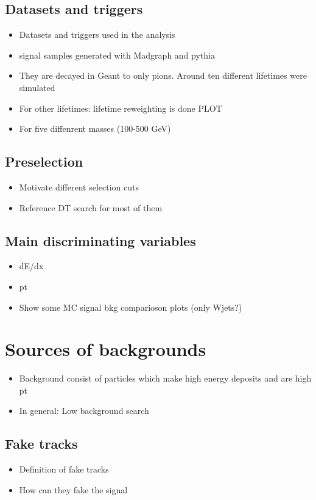 \subsection{Datasets and triggers}
\begin{itemize}
\item Datasets and triggers used in the analysis
\item signal samples generated with Madgraph and pythia
\item They are decayed in Geant to only pions. Around ten different lifetimes were simulated
\item For other lifetimes: lifetime reweighting is done PLOT
\item For five diffenrent masses (100-500 GeV) 
\end{itemize}
\subsection{Preselection}
\begin{itemize}
\item Motivate different selection cuts
\item Reference DT search for most of them
\end{itemize}
\subsection{Main discriminating variables}
\begin{itemize}
\item dE/dx
\item pt
\item Show some MC signal bkg comparioson plots (only Wjets?)
\end{itemize}

\section{Sources of backgrounds}
\label{sec:SourcesOfBackgrounds}
\begin{itemize}
\item Background consist of particles which make high energy deposits and are high pt
\item In general: Low background search
\end{itemize}
\subsection{Fake tracks}
\begin{itemize}
\item Definition of fake tracks
\item How can they fake the signal
\end{itemize}
